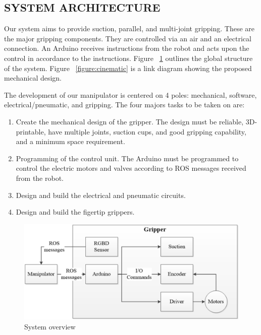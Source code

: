 \documentclass[letterpaper, 10 pt, conference]{ieeeconf}  %
\begin{document}
\subsection{SYSTEM ARCHITECTURE}


Our system aims to provide suction, parallel, and multi-joint gripping. These are the major gripping components. They are controlled via an air and an electrical connection. An Arduino receives instructions from the robot and acts upon the control in accordance to the instructions. Figure ~\ref{figure:system} outlines the global structure of the system. Figure ~\ref{figure:cinematic} is a link diagram showing the proposed mechanical design.

The development of our manipulator is centered on 4 poles: mechanical, software, electrical/pneumatic, and gripping. The four majors tasks to be taken on are:
\begin{enumerate}
  \item Create the mechanical design of the gripper. The design must be reliable, 3D-printable, have multiple joints, suction cups, and good gripping capability, and a minimum space requirement.
  \item Programming of the control unit. The Arduino must be programmed to control the electric motors and valves according to ROS messages received from the robot.
  \item Design and build the electrical and pneumatic circuits.
  \item Design and build the figertip grippers.
\end{enumerate}


\begin{figure}[h]
\includegraphics[width=0.7\columnwidth]{system}
\centering
\caption{System overview}
 \label{figure:system}
\end{figure}
\end{document}
